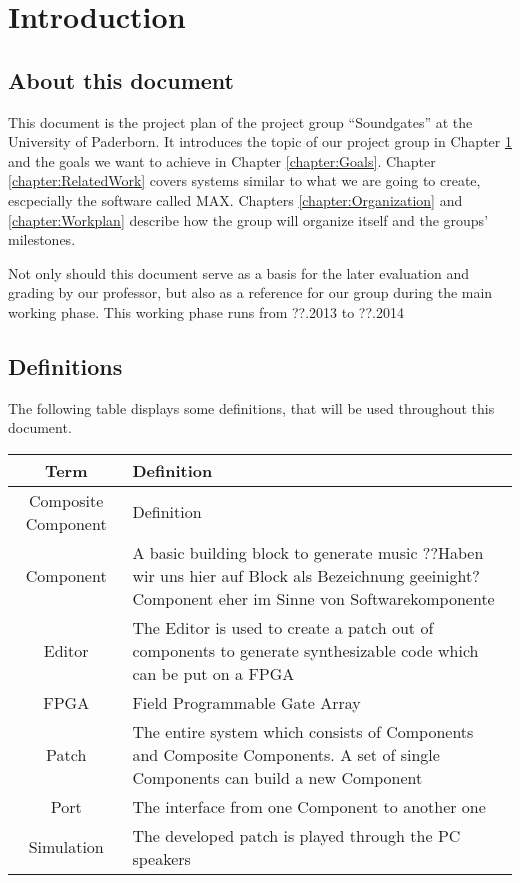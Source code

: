 \chapter{Introduction}
	\label{chapter:Introduction}
	\section{About this document}
	This document is the project plan of the project group ``Soundgates'' at the University of Paderborn. 
	It introduces the topic of our project group in Chapter \ref{chapter:Introduction} and the goals we want to achieve in Chapter \ref{chapter:Goals}.
	Chapter \ref{chapter:RelatedWork} covers systems similar to what we are going to create, escpecially the software called MAX.
	Chapters \ref{chapter:Organization} and \ref{chapter:Workplan} describe how the group will organize itself and the groups' milestones.

	Not only should this document serve as a basis for the later evaluation and grading by our professor, but also as a reference for our group during the main working phase.
	This working phase runs from ??.2013 to ??.2014
	\section{Definitions}
	 The following table displays some definitions, that will be used throughout this document.
	
	 \begin{tabular}[h]{|c|p{9.75cm}|}
	  \hline
	  Term & Definition \\
	  \hline
	  \hline
	  Composite Component & Definition \\\hline
	  Component & A basic building block to generate music ??Haben wir uns hier auf Block als Bezeichnung geeinight? Component eher im Sinne von Softwarekomponente\\\hline
	  Editor & The Editor is used to create a patch out of components to generate synthesizable code which can be put on a FPGA \\\hline
	  FPGA & Field Programmable Gate Array \\\hline
	  Patch & The entire system which consists of Components and Composite Components. A set of single Components can build a new Component \\\hline
	  Port & The interface from one Component to another one \\\hline
	  Simulation & The developed patch is played through the PC speakers \\\hline
	 \end{tabular}
	 
